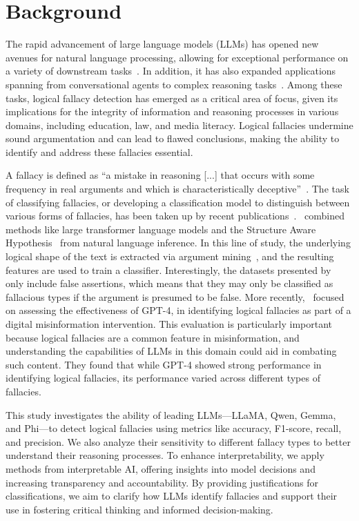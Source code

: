 \documentclass[runningheads]{llncs}
\begin{document}
\section{Background}
The rapid advancement of large language models (LLMs) has opened new avenues for natural language processing, allowing for exceptional performance on a variety of downstream tasks~\cite{jie2024self,grattafiori2024llama}. In addition, it has also expanded applications spanning from conversational agents to complex reasoning tasks~\cite{brown2020language,liu2024two,du2024evaluation}. Among these tasks, logical fallacy detection has emerged as a critical area of focus, given its implications for the integrity of information and reasoning processes in various domains, including education, law, and media literacy. Logical fallacies undermine sound argumentation and can lead to flawed conclusions, making the ability to identify and address these fallacies essential.

A fallacy is defined as ``a mistake in reasoning [...] that occurs with some frequency in real arguments and which is characteristically deceptive''~\cite{govier2018problems}. The task of classifying fallacies, or developing a classification model to distinguish between various forms of fallacies, has been taken up by recent publications~\cite{alhindi2023multitask}.~\cite{jin2022logical} combined methods like large transformer language models and the Structure Aware Hypothesis~\cite{yin2019benchmarking} from natural language inference. In this line of study, the underlying logical shape of the text is extracted via argument mining~\cite{lawrence2020argument}, and the resulting features are used to train a classifier. Interestingly, the datasets presented by~\cite{jin2022logical} only include false assertions, which means that they may only be classified as fallacious types if the argument is presumed to be false. More recently,~\cite{lim2024evaluation} focused on assessing the effectiveness of GPT-4, in identifying logical fallacies as part of a digital misinformation intervention. This evaluation is particularly important because logical fallacies are a common feature in misinformation, and understanding the capabilities of LLMs in this domain could aid in combating such content. They found that while GPT-4 showed strong performance in identifying logical fallacies, its performance varied across different types of fallacies. 

This study investigates the ability of leading LLMs—LLaMA, Qwen, Gemma, and Phi—to detect logical fallacies using metrics like accuracy, F1-score, recall, and precision. We also analyze their sensitivity to different fallacy types to better understand their reasoning processes. To enhance interpretability, we apply methods from interpretable AI, offering insights into model decisions and increasing transparency and accountability. By providing justifications for classifications, we aim to clarify how LLMs identify fallacies and support their use in fostering critical thinking and informed decision-making.
\end{document}
